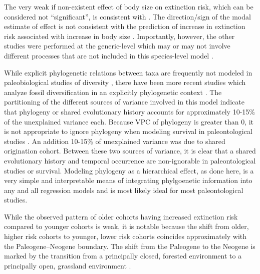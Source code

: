 \documentclass[12pt,letterpaper]{article}
\begin{document}
The very weak if non-existent effect of body size on extinction risk, which can be considered not ``significant'', is consistent with \citet{Tomiya2013}. The direction/sign of the modal estimate of effect is not consistent with the prediction of increase in extinction risk associated with increase in body size \citep{Liow2008}. Importantly, however, the other studies were performed at the generic-level which may or may not involve different processes that are not included in this species-level model \citep{Liow2008,Tomiya2013}.

While explicit phylogenetic relations between taxa are frequently not modeled in paleobiological studies of diversity \citep{Alroy2009,Foote2013,Jablonski2006a,Hunt2007a,Liow2008,Payne2007,Alroy2000g,Jernvall2002,Jernvall2004,Marcot2014}, there have been more recent studies which analyze fossil diversification in an explicitly phylogenetic context \citep{Slater2012,Slater2013a,Tomiya2013,Harnik2014,Simpson2011a}. The partitioning of the different sources of variance involved in this model indicate that phylogeny or shared evolutionary history accounts for approximately 10-15\% of the unexplained variance each. Because VPC of phylogeny is greater than 0, it is not appropriate to ignore phylogeny when modeling survival in paleontological studies \citep{Housworth2004}. An addition 10-15\% of unexplained variance was due to shared origination cohort. Between these two sources of variance, it is clear that a shared evolutionary history and temporal occurrence are non-ignorable in paleontological studies or survival. Modeling phylogeny as a hierarchical effect, as done here, is a very simple and interpretable means of integrating phylgoenetic information into any and all regression models \citep{Lynch1991,Housworth2004} and is most likely ideal for most paleontological studies.

While the observed pattern of older cohorts having increased extinction risk compared to younger cohorts is weak, it is notable because the shift from older, higher risk cohorts to younger, lower risk cohorts coincides approximately with the Paleogene--Neogene boundary. The shift from the Paleogene to the Neogene is marked by the transition from a principally closed, forested environment to a principally open, grassland environment \citep{Stromberg2005,Janis1993a,Janis2000}.  %

\end{document}
